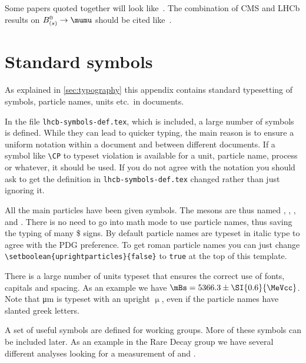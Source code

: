 Some \lhcb papers quoted together will look
like~\cite{LHCb-PAPER-2011-007,LHCb-PAPER-2011-006,
  LHCb-PAPER-2011-005,LHCb-PAPER-2011-004,LHCb-PAPER-2011-003}.
The combination of CMS and LHCb results on $B^0_{(s)} \to \mumu$ should be cited like~\cite{LHCb-CONF-2013-012}.

\section{Standard symbols}

As explained in \cref{sec:typography} this appendix contains standard
typesetting of symbols, particle names, units etc.\ in \lhcb
documents. 

In the file \texttt{lhcb-symbols-def.tex}, which is included, a
large number of symbols is defined. While they can lead to quicker
typing, the main reason is to ensure a uniform notation within a
document and between different \lhcb documents. If a symbol
like \texttt{\textbackslash CP} to typeset \CP violation is available
for a unit, particle name, process or whatever, it should be used.  If
you do not agree with the notation you should ask to get the
definition in \texttt{lhcb-symbols-def.tex} changed rather than just
ignoring it.

All the main particles have been given symbols. The \PB mesons are thus
named \Bp, \Bd, \Bs, and \Bc. There is no need to go into math mode to
use particle names, thus saving the typing of many \$ signs. By
default particle names are typeset in italic type to agree with the
PDG preference. To get roman particle
names you can just change 
\texttt{\textbackslash setboolean\{uprightparticles\}\{false\}}
to \texttt{true} at the top of this template.

There is a large number of units typeset that ensures the correct use
of fonts, capitals and spacing. As an example we have
$\mBs=5366.3\pm\SI{0.6}{\MeVcc}$. Note that \si{\micro\metre} is typeset with an 
upright $\upmu$, even if the particle names have slanted greek letters.

A set of useful symbols are defined for working groups. More of these
symbols can be included later. As an example in the Rare Decay group
we have several different analyses looking for a measurement of
 and .



